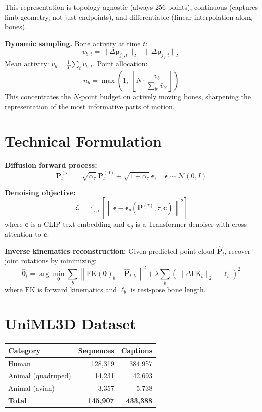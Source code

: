 \documentclass[10pt,twocolumn]{article}
\begin{document}
This representation is topology-agnostic (always 256 points),
continuous (captures limb geometry, not just endpoints), and
differentiable (linear interpolation along bones).

\textbf{Dynamic sampling.} Bone activity at time $t$:
\[
  v_{b,t} = \|\Delta\mathbf{p}_{j_a,t}\|_2 + \|\Delta\mathbf{p}_{j_b,t}\|_2
\]
Mean activity: $\bar{v}_b = \frac{1}{T}\sum_t v_{b,t}$.
Point allocation:
\[
  n_b = \max\!\left(1,\;\left\lfloor N\cdot
    \frac{\bar{v}_b}{\sum_{b'}\bar{v}_{b'}}\right\rfloor\right)
\]
This concentrates the $N$-point budget on actively moving bones,
sharpening the representation of the most informative parts of motion.

\section{Technical Formulation}

\textbf{Diffusion forward process:}
\[
  \mathbf{P}_t^{(\tau)} = \sqrt{\bar{\alpha}_\tau}\,\mathbf{P}_t^{(0)}
    + \sqrt{1-\bar{\alpha}_\tau}\,\boldsymbol{\epsilon},
    \quad\boldsymbol{\epsilon}\sim\mathcal{N}(0,I)
\]

\textbf{Denoising objective:}
\[
  \mathcal{L} = \mathbb{E}_{\tau,\boldsymbol{\epsilon}}\!\left[
    \left\|\boldsymbol{\epsilon}
      - \boldsymbol{\epsilon}_\theta\!\left(\mathbf{P}^{(\tau)},
        \tau, \mathbf{c}\right)
    \right\|^2\right]
\]
where $\mathbf{c}$ is a CLIP text embedding and
$\boldsymbol{\epsilon}_\theta$ is a Transformer denoiser with
cross-attention to $\mathbf{c}$.

\textbf{Inverse kinematics reconstruction:} Given predicted point cloud
$\hat{\mathbf{P}}_t$, recover joint rotations by minimizing:
\[
  \hat{\boldsymbol{\theta}}_t = \arg\min_{\boldsymbol{\theta}}
    \sum_b\!\left\|\mathrm{FK}(\boldsymbol{\theta})_b
      - \hat{\mathbf{P}}_{t,b}\right\|^2
    + \lambda\sum_b\!\left(\|\Delta\mathrm{FK}_b\|_2 - \ell_b\right)^2
\]
where $\mathrm{FK}$ is forward kinematics and $\ell_b$ is rest-pose
bone length.

\section{UniML3D Dataset}

\begin{center}
\begin{tabular}{lrr}
\toprule
Category & Sequences & Captions \\
\midrule
Human             & 128,319 & 384,957 \\
Animal (quadruped) & 14,231 & 42,693 \\
Animal (avian)     & 3,357  & 5,738  \\
\midrule
\textbf{Total}    & \textbf{145,907} & \textbf{433,388} \\
\bottomrule
\end{tabular}
\end{center}
\end{document}
